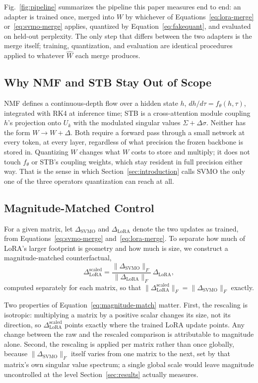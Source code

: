 \documentclass[conference]{IEEEtran}
\begin{document}
Fig.~\ref{fig:pipeline} summarizes the pipeline this paper measures end to end: an adapter is trained once, merged into $W$ by whichever of Equations~\ref{eq:lora-merge} or~\ref{eq:svmo-merge} applies, quantized by Equation~\ref{eq:fakequant}, and evaluated on held-out perplexity. The only step that differs between the two adapters is the merge itself; training, quantization, and evaluation are identical procedures applied to whatever $\hat W$ each merge produces.

\subsection{Why NMF and STB Stay Out of Scope}

NMF defines a continuous-depth flow over a hidden state $h$, $dh/d\tau = f_\theta(h,\tau)$, integrated with RK4 at inference time; STB is a cross-attention module coupling $h$'s projection onto $U_k$ with the modulated singular values $\Sigma+\Delta\sigma$. Neither has the form $W \to W+\Delta$. Both require a forward pass through a small network at every token, at every layer, regardless of what precision the frozen backbone is stored in. Quantizing $W$ changes what $W$ costs to store and multiply; it does not touch $f_\theta$ or STB's coupling weights, which stay resident in full precision either way. That is the sense in which Section~\ref{sec:introduction} calls SVMO the only one of the three operators quantization can reach at all.

\subsection{Magnitude-Matched Control}
\label{sec:magnitude-control}

For a given matrix, let $\Delta_{\text{SVMO}}$ and $\Delta_{\text{LoRA}}$ denote the two updates as trained, from Equations~\ref{eq:svmo-merge} and~\ref{eq:lora-merge}. To separate how much of LoRA's larger footprint is geometry and how much is size, we construct a magnitude-matched counterfactual,
\begin{equation}
\Delta_{\text{LoRA}}^{\text{scaled}} = \frac{\|\Delta_{\text{SVMO}}\|_F}{\|\Delta_{\text{LoRA}}\|_F}\,\Delta_{\text{LoRA}},
\label{eq:magnitude-match}
\end{equation}
computed separately for each matrix, so that $\|\Delta_{\text{LoRA}}^{\text{scaled}}\|_F = \|\Delta_{\text{SVMO}}\|_F$ exactly.

Two properties of Equation~\ref{eq:magnitude-match} matter. First, the rescaling is isotropic: multiplying a matrix by a positive scalar changes its size, not its direction, so $\Delta_{\text{LoRA}}^{\text{scaled}}$ points exactly where the trained LoRA update points. Any change between the raw and the rescaled comparison is attributable to magnitude alone. Second, the rescaling is applied per matrix rather than once globally, because $\|\Delta_{\text{SVMO}}\|_F$ itself varies from one matrix to the next, set by that matrix's own singular value spectrum; a single global scale would leave magnitude uncontrolled at the level Section~\ref{sec:results} actually measures.
\end{document}
